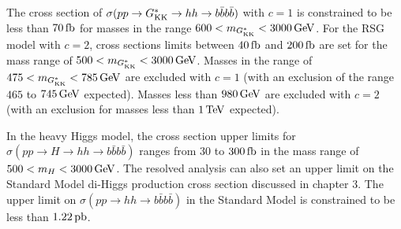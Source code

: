 The cross section of $\sigma(pp \to G^*_{\rm KK} \to hh \to b\bar{b}b\bar{b})$ with $c=1$ is constrained to be less than $70 \mbox{\,fb}$ for masses in the range $600 < m_{\Gkk} < 3000 \GeV$. For the RSG model with $c=2$, cross sections limits between $40\mbox{\,fb}$ and $200 \mbox{\,fb}$ are set for the mass range of $500 < m_{\Gkk} < 3000 \GeV$. Masses in the range of $475 < m_{\Gkk} < 785 \GeV$ are excluded with $c=1$ (with an exclusion of the range $465$ to $745 \GeV$ expected). Masses less than $980 \GeV$ are excluded with $c=2$ (with an exclusion for masses less than $1 \TeV$ expected). 

In the heavy Higgs model, the cross section upper limits for $\sigma(pp \to H \to hh \to b\bar{b}b\bar{b})$ ranges from $30$ to $300 \mbox{\,fb}$ in the mass range of $500 < m_{H} < 3000 \GeV$. 
%
The resolved analysis can also set an upper limit on the Standard Model di-Higgs production cross section discussed in chapter 3. The upper limit on $\sigma(pp \to hh \to b\bar{b}b\bar{b})$ in the Standard Model is constrained to be less than $1.22 \mbox{\,pb}$. 


